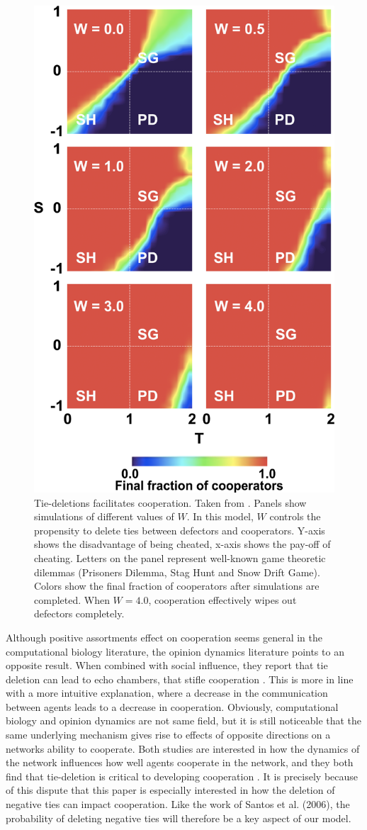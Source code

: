 \documentclass{article}
\begin{document}
\begin{figure}[H]
    \centering
    \includegraphics[width=.5\linewidth]{../plots/references/santos.png}
  \caption{Tie-deletions facilitates cooperation. Taken from \protect\citeauthor{santos_cooperation_2006} \protect\citeyear{santos_cooperation_2006}. Panels show simulations of different values of $W$. In this model, $W$ controls the propensity to delete ties between defectors and cooperators. Y-axis shows the disadvantage of being cheated, x-axis shows the pay-off of cheating. Letters on the panel represent well-known game theoretic dilemmas (Prisoners Dilemma, Stag Hunt and Snow Drift Game). Colors show the final fraction of cooperators after simulations are completed. When $W = 4.0$, cooperation effectively wipes out defectors completely. }
  \label{fig:santos}
\end{figure}

Although positive assortments effect on cooperation seems general in the computational biology literature, the opinion dynamics literature points to an opposite result. When combined with social influence, they report that tie deletion can lead to echo chambers, that stifle cooperation \cite{sasahara_social_2021}. This is more in line with a more intuitive explanation, where a decrease in the communication between agents leads to a decrease in cooperation. Obviously, computational biology and opinion dynamics are not same field, but it is still noticeable that the same underlying mechanism gives rise to effects of opposite directions on a networks ability to cooperate. Both studies are interested in how the dynamics of the network influences how well agents cooperate in the network, and they both find that tie-deletion is critical to developing cooperation \cite{santos_cooperation_2006,sasahara_social_2021}. It is precisely because of this dispute that this paper is especially interested in how the deletion of negative ties can impact cooperation. Like the work of Santos et al. (2006), the probability of deleting negative ties will therefore be a key aspect of our model.  
\end{document}
